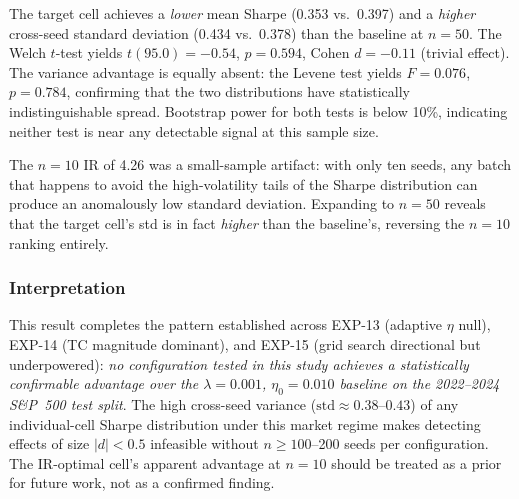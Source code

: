 \documentclass[conference]{IEEEtran}
\begin{document}
\begin{table}[t]
\centering
\caption{EXP-16: Confirmatory $n=50$ comparison of stability-optimal
cell vs.\ baseline (real S\&P~500 test split, 2022--2024).}
\label{tab:exp16_summary}
\end{table}

The target cell achieves a \emph{lower} mean Sharpe (0.353 vs.\ 0.397)
and a \emph{higher} cross-seed standard deviation (0.434 vs.\ 0.378)
than the baseline at $n=50$. The Welch $t$-test yields
$t(95.0)=-0.54$, $p=0.594$, Cohen $d=-0.11$ (trivial effect).
The variance advantage is equally absent: the Levene test yields
$F=0.076$, $p=0.784$, confirming that the two distributions
have statistically indistinguishable spread. Bootstrap power for
both tests is below 10\%, indicating neither test is near any
detectable signal at this sample size.

The $n=10$ IR of 4.26 was a small-sample artifact: with only
ten seeds, any batch that happens to avoid the high-volatility
tails of the Sharpe distribution can produce an anomalously
low standard deviation. Expanding to $n=50$ reveals that the
target cell's std is in fact \emph{higher} than the baseline's,
reversing the $n=10$ ranking entirely.

\subsubsection{Interpretation}

This result completes the pattern established across EXP-13
(adaptive $\eta$ null), EXP-14 (TC magnitude dominant), and
EXP-15 (grid search directional but underpowered): \emph{no
configuration tested in this study achieves a statistically
confirmable advantage over the $\lambda=0.001$, $\eta_0=0.010$
baseline on the 2022--2024 S\&P~500 test split}. The high
cross-seed variance ($\mathrm{std} \approx 0.38$--$0.43$) of
any individual-cell Sharpe distribution under this market regime
makes detecting effects of size $|d| < 0.5$ infeasible without
$n \geq 100$--200 seeds per configuration. The IR-optimal cell's
apparent advantage at $n=10$ should be treated as a prior for
future work, not as a confirmed finding.
\end{document}
